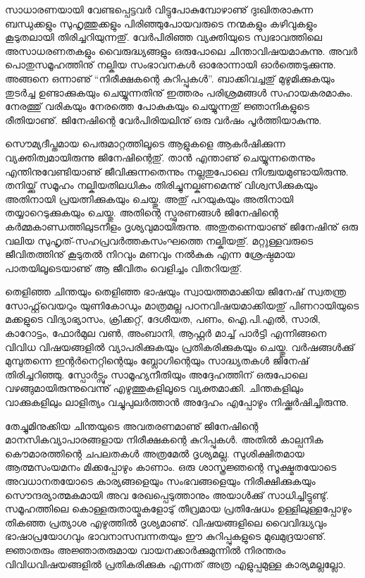 \newpage
{}
സാധാരണയായി വേണ്ടപ്പെട്ടവര്‍ വിട്ടുപോകുമ്പോഴാണു് ദുഃഖിതരാകുന്ന ബന്ധുക്കളും സുഹൃത്തുക്കളും പിരിഞ്ഞുപോയവരുടെ നന്മകളും
കഴിവുകളും കൂടുതലായി തിരിച്ചറിയുന്നതു്. വേര്‍പിരിഞ്ഞ വ്യക്തിയുടെ സ്വഭാവത്തിലെ അസാധരണതകളും വൈരുദ്ധ്യങ്ങളും ഒരുപോലെ
ചിന്താവിഷയമാകുന്നു. അവര്‍ പൊതുസമൂഹത്തിനു് നല്കിയ സംഭാവനകള്‍ ഓരോന്നായി ഓര്‍ത്തെടുക്കുന്നു. അങ്ങനെ ഒന്നാണു്
``നിരീക്ഷകന്റെ കുറിപ്പുകള്‍''. ബാക്കിവച്ചതു് മുഴുമിക്കുകയും തുടര്‍ച്ച ഉണ്ടാക്കുകയും ചെയ്യുന്നതിനു് ഇത്തരം പരിശ്രമങ്ങള്‍ സഹായകരമാകും.
നേരത്തു് വരികയും നേരത്തെ പോകുകയും ചെയ്യുന്നതു് ജ്ഞാനികളുടെ രീതിയാണു്. ജിനേഷിന്റെ വേര്‍പിരിയലിനു് ഒരു വര്‍ഷം പൂര്‍ത്തിയാകുന്നു.

സൌമ്യദീപ്തമായ പെരുമാറ്റത്തിലൂടെ ആളുകളെ ആകര്‍ഷിക്കുന്ന വ്യക്തിത്വമായിരുന്നു ജിനേഷിന്റെതു്. താന്‍ എന്താണു് ചെയ്യുന്നതെന്നും
എന്തിനുവേണ്ടിയാണു് ജീവിക്കുന്നതെന്നും നല്ലതുപോലെ നിശ്ചയമുണ്ടായിരുന്നു. തനിയ്ക്കു് സമൂഹം നല്കിയതിലധികം തിരിച്ചുനല്കണമെന്നു്
വിശ്വസിക്കുകയും അതിനായി പ്രയത്നിക്കുകയും ചെയ്തു. അതു് പറയുകയും അതിനായി തയ്യാറെടുക്കുകയും ചെയ്തു. അതിന്റെ സ്ഫുരണങ്ങള്‍
ജിനേഷിന്റെ കര്‍മ്മകാണ്ഡത്തിലുടനീളം ദൃശ്യവുമായിരുന്നു. അതുതന്നെയാണു് ജിനേഷിനു് ഒരു വലിയ സുഹൃത്-സഹപ്രവര്‍ത്തകസംഘത്തെ
നല്കിയതു്. മറ്റുള്ളവരുടെ ജീവിതത്തിനു് കൂടുതല്‍ നിറവും മണവും നല്‍കുക എന്ന ശ്രേഷ്ഠമായ പാതയിലൂടെയാണു് ആ ജീവിതം വെളിച്ചം വിതറിയതു്.

തെളിഞ്ഞ ചിന്തയും തെളിഞ്ഞ ഭാഷയും സ്വായത്തമാക്കിയ ജിനേഷ് സ്വതന്ത്ര സോഫ്റ്റ്‌വെയറും യുണികോഡും മാത്രമല്ല പഠനവിഷയമാക്കിയതു് 
പിണറായിയുടെ മക്കളുടെ വിദ്യാഭ്യാസം, ക്രിക്കറ്റ്, ദേശീയത, പണം, ഐ.പി.എല്‍, സാരി, കാറോട്ടം, ഫോര്‍മുല വണ്‍, അംബാനി, ആഫ്റ്റര്‍ 
മാച്ച് പാര്‍ട്ടി എന്നിങ്ങനെ വിവിധ വിഷയങ്ങളില്‍ വ്യാപരിക്കുകയും പ്രതികരിക്കുകയും ചെയ്തു. വര്‍ഷങ്ങള്‍ക്കു് മുമ്പുതന്നെ ഇന്റര്‍നെറ്റിന്റെയും 
ബ്ലോഗിന്റെയും സാദ്ധ്യതകള്‍ ജിനേഷ് തിരിച്ചറിഞ്ഞു.  സ്പോര്‍ട്സും സാമൂഹ്യനീതിയും അദ്ദേഹത്തിന് ഒരുപോലെ വഴങ്ങുമായിരുന്നുവെന്നു് 
എഴുത്തുകളിലൂടെ വ്യക്തമാക്കി. ചിന്തകളിലും വാക്കുകളിലും ലാളിത്യം വച്ചുപുലര്‍ത്താന്‍ അദ്ദേഹം എപ്പോഴും നിഷ്ക്കര്‍ഷിച്ചിരുന്നു. 

തേച്ചുമിനുക്കിയ ചിന്തയുടെ അവതരണമാണു് ജിനേഷിന്റെ മാനസികവ്യാപാരങ്ങളായ നിരീക്ഷകന്റെ കുറിപ്പുകള്‍. അതില്‍ കാല്പനിക കൌമാരത്തിന്റെ 
ചപലതകള്‍ അത്രമേല്‍ ദൃശ്യമല്ല. സുശിക്ഷിതമായ ആത്മസംയമനം മിക്കപ്പോഴും കാണാം. ഒരു ശാസ്ത്രജ്ഞന്റെ സൂക്ഷ്മതയോടെ അവധാനതയോടെ 
കാര്യങ്ങളെയും സംഭവങ്ങളെയും നിരീക്ഷിക്കുകയും സൌന്ദര്യാത്മകമായി അവ രേഖപ്പെടുത്താനും അയാള്‍ക്കു് സാധിച്ചിട്ടുണ്ടു്. സമൂഹത്തിലെ 
കൊള്ളരുതായ്മകളോടു് തീവ്രമായ പ്രതിഷേധം ഉള്ളിലുള്ളപ്പോഴും തികഞ്ഞ പ്രത്യാശ എഴുത്തില്‍ ദൃശ്യമാണു്. വിഷയങ്ങളിലെ വൈവിദ്ധ്യവും 
ഭാഷാപ്രയോഗവും ഭാവനാസമ്പന്നതയും ഈ കുറിപ്പുകളുടെ മുഖമുദ്രയാണു്. ജ്ഞാതരും അജ്ഞാതരുമായ വായനക്കാര്‍ക്കുമുന്നില്‍ നിരന്തരം 
വിവിധവിഷയങ്ങളില്‍ പ്രതികരിക്കുക എന്നത് അത്ര എളുപ്പമുള്ള കാര്യമല്ലല്ലോ.

